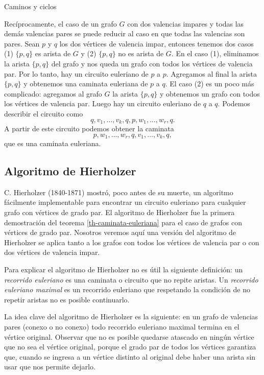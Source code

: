 \begin{section}{Caminos y ciclos}
\begin{observacion}\label{obs-impar-a-par}
    Recíprocamente,  el caso de un grafo  $G$ con dos valencias impares y todas las demás valencias pares  se puede reducir al caso en que todas las valencias son pares. Sean $p$ y $q$ los dos vértices de valencia impar,  entonces tenemos dos casos (1) $\{p,q\}$  es arista de $G$ y (2) $\{p,q\}$  no es arista de $G$.  En el caso (1),  eliminamos la arista  $\{p,q\}$  del grafo  y  nos queda un grafo  con todos los vértices de valencia par. Por lo tanto, hay un circuito euleriano de $p$  a $p$. Agregamos al final la arista $\{p,q\}$  y obtenemos una caminata euleriana de  $p$ a $q$. El caso (2) es un poco más complicado: agregamos al grafo $G$ la arista $\{p,q\}$ y obtenemos un grafo  con todos los vértices de valencia par. Luego  hay un circuito euleriano de $q$ a $q$. Podemos describir el circuito como
    $$
    q,v_1,\ldots,v_k,q,p,w_1,\ldots,w_r,q.
    $$
    A partir de este circuito podemos obtener la caminata
    $$
    p,w_1,\ldots,w_r,q,v_1,\ldots,v_k,q, 
    $$
    que es una caminata euleriana. 
\end{observacion}

\subsection*{Algoritmo de Hierholzer}

C. Hierholzer (1840-1871) mostró, poco antes de su muerte, un algoritmo fácilmente implementable para encontrar un circuito euleriano  para cualquier grafo  con vértices de grado  par. El algoritmo de Hierholzer fue la primera demostración del teorema \ref{th-caminata-euleriana} para el caso  de grafos con vértices de grado par. 
Nosotros veremos aquí una versión del algoritmo de Hierholzer se aplica tanto a los grafos con todos los vértices de valencia par o con dos vértices de valencia impar. 

Para explicar el algoritmo de Hierholzer no es útil la siguiente definición:  un \textit{recorrido euleriano} es una caminata o circuito que no repite aristas. Un \textit{recorrido euleriano maximal}  es un recorrido euleriano que respetando la condición de no repetir aristas no es posible continuarlo.  

La idea clave del algoritmo de Hierholzer  es la siguiente:  en un grafo de valencias pares (conexo o no conexo) todo recorrido euleriano maximal termina en el vértice original. Observar que no es posible quedarse atascado en ningún vértice que no sea  el vértice original, porque el grado par de todos los vértices garantiza que, cuando se ingresa a un vértice distinto al original debe haber una  arista sin usar que nos permite dejarlo. 


\end{section}
